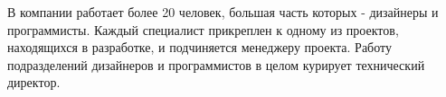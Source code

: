 В компании работает более 20 человек, большая часть которых - дизайнеры и программисты. 
Каждый специалист прикреплен к одному из проектов, находящихся в разработке, и подчиняется 
менеджеру проекта. Работу подразделений дизайнеров и программистов в целом курирует технический директор.
